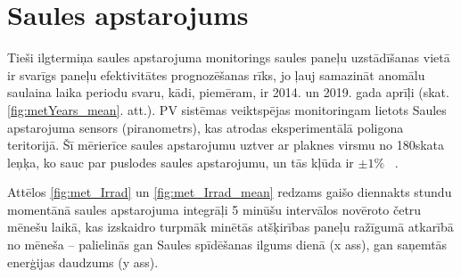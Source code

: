 \section{Saules apstarojums}


Tieši ilgtermiņa saules apstarojuma monitorings saules paneļu uzstādīšanas vietā ir svarīgs paneļu efektivitātes prognozēšanas rīks, jo ļauj samazināt anomālu saulaina laika periodu svaru, kādi, piemēram, ir 2014. un 2019. gada aprīļi (skat. \ref{fig:metYears_mean}. att.). PV sistēmas veiktspējas monitoringam lietots Saules apstarojuma sensors (piranometrs), kas atrodas eksperimentālā poligona teritorijā. Šī mērierīce saules apstarojumu uztver ar plaknes virsmu no 180\textdegree skata leņķa, ko sauc par puslodes saules apstarojumu, un tās kļūda ir  $\pm 1 \%$ ~\cite{pyranometer}.

Attēlos \ref{fig:met_Irrad} un \ref{fig:met_Irrad_mean} redzams gaišo diennakts stundu momentānā saules apstarojuma integrāļi 5 minūšu intervālos novēroto četru mēnešu laikā, kas izskaidro turpmāk minētās atšķirības paneļu ražīgumā atkarībā no mēneša -- palielinās gan Saules spīdēšanas ilgums dienā (x ass), gan saņemtās enerģijas daudzums (y ass).

